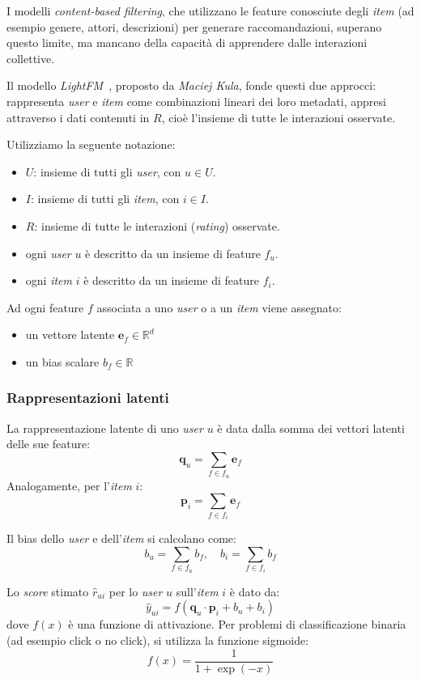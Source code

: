 I modelli \textit{content-based filtering}, che utilizzano le feature conosciute degli \textit{item} (ad esempio genere, attori, descrizioni) per generare raccomandazioni, superano questo limite, ma mancano della capacità di apprendere dalle interazioni collettive.

Il modello \textit{LightFM}~\cite{LightFM}, proposto da \textit{Maciej Kula}, fonde questi due approcci: rappresenta \textit{user} e \textit{item} come combinazioni lineari dei loro metadati, appresi attraverso i dati contenuti in $R$, cioè l'insieme di tutte le interazioni osservate.

Utilizziamo la seguente notazione:
\begin{itemize}
    \item $U$: insieme di tutti gli \textit{user}, con $u \in U$.
    \item $I$: insieme di tutti gli \textit{item}, con $i \in I$.
    \item $R$: insieme di tutte le interazioni (\textit{rating}) osservate.
    \item ogni \textit{user} $u$ è descritto da un insieme di feature $f_u$.
    \item ogni \textit{item} $i$ è descritto da un insieme di feature $f_i$.
\end{itemize}

Ad ogni feature $f$ associata a uno \textit{user} o a un \textit{item} viene assegnato:
\begin{itemize}
    \item un vettore latente $\mathbf{e}_f \in \mathbb{R}^d$
    \item un bias scalare $b_f \in \mathbb{R}$
\end{itemize}

\subsubsection{Rappresentazioni latenti}
La rappresentazione latente di uno \textit{user} $u$ è data dalla somma dei vettori latenti delle sue feature:
\[
\mathbf{q}_u = \sum_{f \in f_u} \mathbf{e}_f
\]
Analogamente, per l'\textit{item} $i$:
\[
\mathbf{p}_i = \sum_{f \in f_i} \mathbf{e}_f
\]

Il bias dello \textit{user} e dell'\textit{item} si calcolano come:
\[
b_u = \sum_{f \in f_u} b_f, \quad b_i = \sum_{f \in f_i} b_f
\]

Lo \textit{score} stimato $\hat{r}_{ui}$ per lo \textit{user} $u$ sull'\textit{item} $i$ è dato da:
\[
\hat{y}_{ui} = f\left( \mathbf{q}_u \cdot \mathbf{p}_i + b_u + b_i \right)
\]
dove $f(x)$ è una funzione di attivazione. Per problemi di classificazione binaria (ad esempio click o no click), si utilizza la funzione sigmoide:
\[
f(x) = \frac{1}{1 + \exp(-x)}
\]

